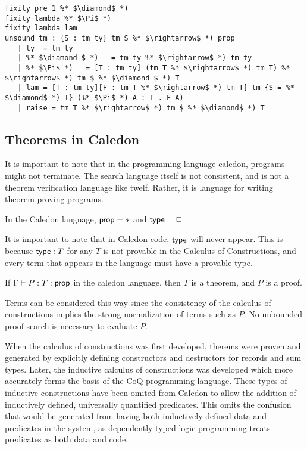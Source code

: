 \begin{lstlisting}
fixity pre 1 %* $\diamond$ *)
fixity lambda %* $\Pi$ *)
fixity lambda lam
unsound tm : {S : tm ty} tm S %* $\rightarrow$ *) prop
   | ty  = tm ty
   | %* $\diamond $ *)   = tm ty %* $\rightarrow$ *) tm ty
   | %* $\Pi$ *)   = [T : tm ty] (tm T %* $\rightarrow$ *) tm T) %* $\rightarrow$ *) tm $ %* $\diamond $ *) T
   | lam = [T : tm ty][F : tm T %* $\rightarrow$ *) tm T] tm {S = %* $\diamond$ *) T} (%* $\Pi$ *) A : T . F A)
   | raise = tm T %* $\rightarrow$ *) tm $ %* $\diamond$ *) T
\end{lstlisting}

\subsection{Theorems in Caledon}

It is important to note that in the programming language caledon, programs might not terminate.  
The search language itself is not consistent, and is not a theorem verification language like twelf.  
Rather, it is language for writing theorem proving programs.  

\begin{definition}
In the Caledon language, $\mathsf{prop} = *$ and $\mathsf{type} = \Box$
\end{definition}

It is important to note that in Caledon code, $\mathsf{type}$ will never appear.  This is because $\mathsf{type} : T$ for any $T$
is not provable in the Calculus of Constructions, and every term that appears in the language must have a provable type.

\begin{definition}
If $\Gamma \vdash P : T : \mathsf{prop}$ in the caledon language, then $T$ is a theorem, and $P$ is a proof.
\end{definition}

Terms can be considered this way since the consistency of the calculus of constructions implies the strong normalization
of terms such as $P$.  No unbounded proof search is necessary to evaluate $P$.

When the calculus of constructions was first developed, therems were proven and generated by explicitly defining
constructors and destructors for records and sum types.  Later, the inductive calculus of constructions was developed 
\citep{coquand1990inductively} which more accurately forms the basis of the CoQ programming language.  These types of inductive
constructions have been omited from Caledon to allow the addition of inductively defined, universally quantified predicates.
This omits the confusion that would be generated from having both inductively defined data and predicates in the system, as 
dependently typed logic programming treats predicates as both data and code.
